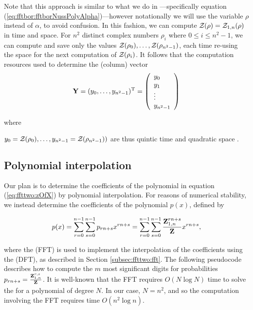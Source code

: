 Note that this approach is similar to what we do in \fftbor---specifically
equation
(\ref{eq:fftbor:fftborNussPolyAlpha})---however notationally we will use the
variable $\rho$ instead of $\alpha$, to avoid confusion. In this fashion, we
can compute ${\mathcal Z}_{}(\rho)={\mathcal Z}_{1,n}(\rho)$ in
 time and  space. For $n^2$ distinct complex numbers
$\rho_i$ where $0 \leq i \leq n^2-1$, we can compute and save only the
values ${\mathcal Z}_{}(\rho_0),\dots,{\mathcal Z}_{}(\rho_{n^2-1})$, each time re-using the
 space for the next computation of ${\mathcal Z}_{}(\rho_i)$.
It follows that
the computation resources used to determine the (column) vector
\begin{align}
\label{eq:ffttwo:yColumn}
\bfY = (y_0,\dots,y_{n^2-1})^{\text T} =
\left(
\begin{array}{l}
y_0 \\
y_1 \\
\vdots \\
y_{n^2-1} \\
\end{array}
\right)
\end{align}

where

$y_0={\mathcal Z}_{}(\rho_0),\dots,y_{n^2-1}={\mathcal Z}_{}(\rho_{n^2-1}))$ are thus
quintic time  and quadratic space .

\subsection{Polynomial interpolation}
Our plan is to determine the coefficients of the polynomial
\emZ{} in equation (\ref{eq:ffttwo:zOfX}) by
polynomial interpolation.  For reasons of numerical stability,
we instead determine the coefficients of the polynomial $p(x)$,
defined by

\begin{align}
\label{eq:ffttwo:pOfX}
p(x) =
\sum_{r=0}^{n-1} \sum_{s=0}^{n-1} p_{rn+s}
 x^{rn+s} =
\sum_{r=0}^{n-1} \sum_{s=0}^{n-1} \frac{\bfZ{rn+s}{1,n}}{\bfZ{}{}}
 x^{rn+s},
\end{align}

where the \fft (FFT) is used to implement the
interpolation of
the coefficients using the \idft (DFT), as
described in Section \ref{subsec:ffttwo:fft}.  The following pseudocode
describes how
to compute the $m$ most significant digits
for probabilities
$p_{rn+s} = \frac{{\bf Z}^{r,s}_{1,n}}{{\bf Z}^{}_{}}$. It is well-known that
the FFT requires $O(N \log N)$ time to solve the \idft for a polynomial
of degree $N$. In our case,
$N=n^2$, and so the computation involving the FFT requires time $O(n^2 \log n)$.


